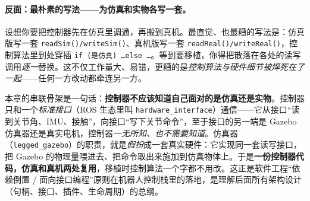 \paragraph{反面：最朴素的写法——为仿真和实物各写一套。}
设想你要把控制器先在仿真里调通，再搬到真机。最直觉、也最糟的写法是：仿真版写一套 \texttt{readSim()/\allowbreak writeSim()}、真机版写一套 \texttt{readReal()/\allowbreak writeReal()}，控制算法里到处穿插 \texttt{if (是仿真) \dots else \dots}。等到要移植，你得把散落在各处的读写调用\emph{逐一}替换\cite{unitree2023quadruped}。这不仅工作量大、易错，更糟的是\emph{控制算法与硬件细节被焊死在了一起}——任何一方改动都牵连另一方。

\begin{insight}\label{ins:qp-abstraction}
本章的串联骨架是一句话：\textbf{控制器不应该知道自己面对的是仿真还是实物}。控制器只和一个\emph{标准接口}（ROS 生态里叫 \texttt{hardware\_interface}）通信——它从接口“读到关节角、IMU、接触”，向接口“写下关节命令”，至于接口的另一端是 Gazebo 仿真器还是真实电机，控制器\emph{一无所知、也不需要知道}。仿真器（\texttt{legged\_gazebo}）的职责，就是\emph{假扮}成一套真实硬件：它实现同一套读写接口，把 Gazebo 的物理量喂进去、把命令取出来施加到仿真物体上。于是\textbf{一份控制器代码，仿真和真机两处复用}，移植时控制算法一个字都不用改\cite{unitree2023quadruped}。这正是软件工程“依赖倒置 / 面向接口编程”原则在机器人控制栈里的落地，是理解后面所有架构设计（句柄、接口、插件、生命周期）的总纲。
\end{insight}

